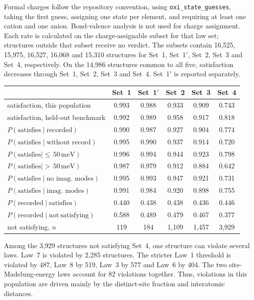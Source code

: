 Formal charges follow the repository convention, using \texttt{oxi\_state\_guesses},
taking the first guess, assigning one state per element, and requiring at least one cation
and one anion. Bond-valence analysis
is not used for charge assignment. Each rate is calculated on the charge-assignable subset
for that law set; structures outside that subset receive no verdict. The subsets contain
16{,}525, 15{,}975, 16{,}527, 16{,}068 and 15{,}310 structures for Set~1, Set~1$'$,
Set~2, Set~3 and Set~4, respectively. On the 14{,}986 structures common to all five,
satisfaction decreases through Set~1, Set~2, Set~3 and Set~4. Set~1$'$ is reported
separately.

\begin{center}
\begin{tabular}{lccccc}
\hline
 & Set~1 & Set~1$'$ & Set~2 & Set~3 & Set~4 \\
\hline
satisfaction, this population & 0.993 & 0.988 & 0.933 & 0.909 & 0.743 \\
satisfaction, held-out benchmark & 0.992 & 0.989 & 0.958 & 0.917 & 0.818 \\
$P(\mathrm{satisfies}\mid\text{recorded})$ & 0.990 & 0.987 & 0.927 & 0.904 & 0.774 \\
$P(\mathrm{satisfies}\mid\text{without record})$ & 0.995 & 0.990 & 0.937 & 0.914 & 0.720 \\
$P(\mathrm{satisfies}\mid{\le}\,50\,\mathrm{meV})$ & 0.996 & 0.994 & 0.944 & 0.923 & 0.798 \\
$P(\mathrm{satisfies}\mid{>}\,50\,\mathrm{meV})$ & 0.987 & 0.979 & 0.912 & 0.884 & 0.642 \\
$P(\mathrm{satisfies}\mid\text{no imag.\ modes})$ & 0.995 & 0.993 & 0.947 & 0.921 & 0.731 \\
$P(\mathrm{satisfies}\mid\text{imag.\ modes})$ & 0.991 & 0.984 & 0.920 & 0.898 & 0.755 \\
$P(\text{recorded}\mid\mathrm{satisfies})$ & 0.440 & 0.438 & 0.438 & 0.436 & 0.446 \\
$P(\text{recorded}\mid\mathrm{not\ satisfying})$ & 0.588 & 0.489 & 0.479 & 0.467 & 0.377 \\
not satisfying, $n$ & 119 & 184 & 1{,}109 & 1{,}457 & 3{,}929 \\
\hline
\end{tabular}
\end{center}

Among the 3{,}929 structures not satisfying Set~4, one structure can violate several
laws. Law~7 is violated by 2{,}285 structures. The stricter Law~1 threshold is violated
by 487, Law~8 by 519, Law~3 by 577 and Law~6 by 404. The two site-Madelung-energy laws
account for 82 violations together. Thus, violations in this population are driven mainly
by the distinct-site fraction and interatomic distances.


